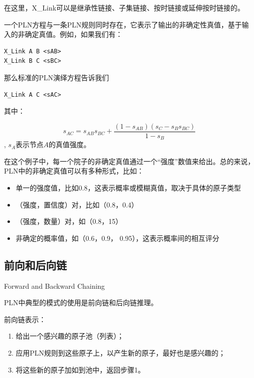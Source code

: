 在这里，X\_Link可以是继承性链接、子集链接、按时链接或延伸按时链接的。

一个PLN方程与一条PLN规则同时存在，它表示了输出的非确定性真值，基于输入的非确定真值。例如，如果我们有：

{\tt\begin{small}\begin{lstlisting}
X_Link A B <sAB>
X_Link B C <sBC>
\end{lstlisting}\end{small}}



那么标准的PLN演绎方程告诉我们

{\tt\begin{small}\begin{lstlisting}
X_Link A C <sAC>
\end{lstlisting}\end{small}}

其中： 

$$
s_{AC}=s_{AB}s_{BC}+\frac{\left(1-s_{AB}\right)\left(s_C-s_Bs_{BC}\right)}{1-s_B}
$$, $s_A$表示节点$A$的真值强度。

在这个例子中，每一个院子的非确定真值通过一个“强度”数值来给出。总的来说，PLN中的非确定真值可以有多种形式，比如：

\begin{itemize}
\item 单一的强度值，比如0.8，这表示概率或模糊真值，取决于具体的原子类型
\item （强度，置信度）对，比如（0.8，0.4）
\item （强度，数量）对，如（0.8，15）
\item 非确定的概率值，如（0.6，0.9， 0.95），这表示概率间的相互评分
\end{itemize}

\subsection{前向和后向链}{Forward and Backward Chaining}

PLN中典型的模式的使用是前向链和后向链推理。

前向链表示：

\begin{enumerate}
\item 给出一个感兴趣的原子池（列表）；
\item 应用PLN规则到这些原子上，以产生新的原子，最好也是感兴趣的；
\item 将这些新的原子加如到池中，返回步骤1。
\end{enumerate}

